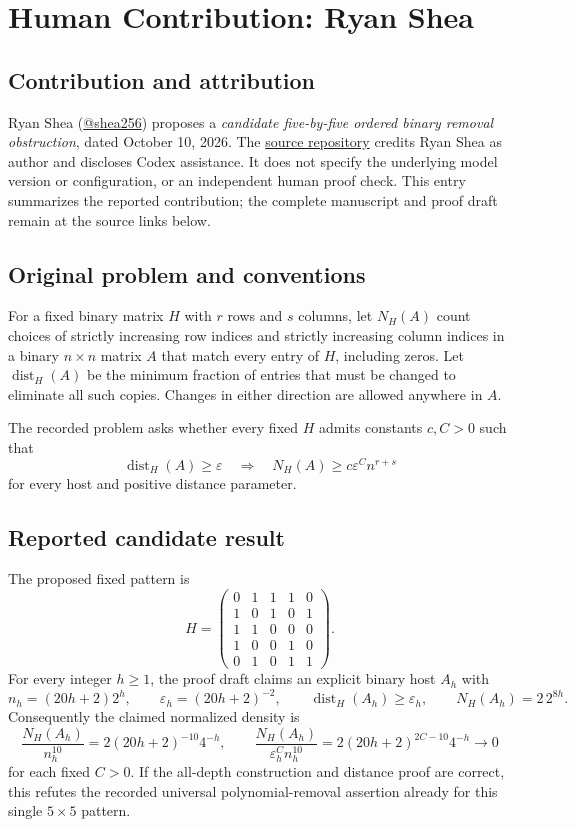 \documentclass[11pt]{article}
\begin{document}
\section*{Human Contribution: Ryan Shea}

\subsection{Contribution and attribution}
Ryan Shea (\href{https://github.com/shea256}{@shea256}) proposes a
\emph{candidate five-by-five ordered binary removal obstruction}, dated
October 10, 2026. The
\href{https://github.com/shea256/ordered-binary-matrix-removal}{source repository}
credits Ryan Shea as author and discloses Codex assistance. It does not
specify the underlying model version or configuration, or an independent
human proof check. This entry summarizes the reported contribution;
the complete manuscript and proof draft remain at the source links below.

\subsection{Original problem and conventions}
For a fixed binary matrix $H$ with $r$ rows and $s$ columns, let $N_H(A)$
count choices of strictly increasing row indices and strictly increasing
column indices in a binary $n\times n$ matrix $A$ that match every entry
of $H$, including zeros. Let $\operatorname{dist}_H(A)$ be the minimum
fraction of entries that must be changed to eliminate all such copies.
Changes in either direction are allowed anywhere in $A$.

The recorded problem asks whether every fixed $H$ admits constants
$c,C>0$ such that
\[
 \operatorname{dist}_H(A)\ge\varepsilon
 \quad\Longrightarrow\quad
 N_H(A)\ge c\varepsilon^C n^{r+s}
\]
for every host and positive distance parameter.

\subsection{Reported candidate result}
The proposed fixed pattern is
\[
 H=\begin{pmatrix}
 0&1&1&1&0\\
 1&0&1&0&1\\
 1&1&0&0&0\\
 1&0&0&1&0\\
 0&1&0&1&1
 \end{pmatrix}.
\]
For every integer $h\ge1$, the proof draft claims an explicit binary
host $A_h$ with
\[
 n_h=(20h+2)2^h,\qquad \varepsilon_h=(20h+2)^{-2},
 \qquad \operatorname{dist}_H(A_h)\ge\varepsilon_h,
 \qquad N_H(A_h)=2\,2^{8h}.
\]
Consequently the claimed normalized density is
\[
 \frac{N_H(A_h)}{n_h^{10}}=2(20h+2)^{-10}4^{-h},
 \qquad
 \frac{N_H(A_h)}{\varepsilon_h^C n_h^{10}}
 =2(20h+2)^{2C-10}4^{-h}\longrightarrow0
\]
for each fixed $C>0$. If the all-depth construction and distance proof
are correct, this refutes the recorded universal polynomial-removal
assertion already for this single $5\times5$ pattern.
\end{document}
